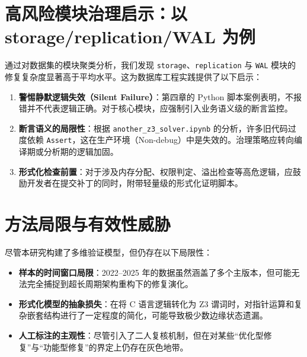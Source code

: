 \section{高风险模块治理启示：以 storage/replication/WAL 为例}

通过对数据集的模块聚类分析，我们发现 \texttt{storage}、\texttt{replication} 与 \texttt{WAL} 模块的修复复杂度显著高于平均水平。这为数据库工程实践提供了以下启示：

\begin{enumerate}
    \item \textbf{警惕静默逻辑失效（Silent Failure）}：第四章的 Python 脚本案例表明，不报错并不代表逻辑正确。对于核心模块，应强制引入业务语义级的断言监控。
    \item \textbf{断言语义的局限性}：根据 \texttt{another\_z3\_solver.ipynb} 的分析，许多旧代码过度依赖 \texttt{Assert}，这在生产环境（Non-debug）中是失效的。治理策略应转向编译期或分析期的逻辑加固。
    \item \textbf{形式化检查前置}：对于涉及内存分配、权限判定、溢出检查等高危逻辑，应鼓励开发者在提交补丁的同时，附带轻量级的形式化证明脚本。
\end{enumerate}

\section{方法局限与有效性威胁}

尽管本研究构建了多维验证模型，但仍存在以下局限性：
\begin{itemize}
    \item \textbf{样本的时间窗口局限}：2022--2025 年的数据虽然涵盖了多个主版本，但可能无法完全捕捉到超长周期架构重构下的修复演化。
    \item \textbf{形式化模型的抽象损失}：在将 C 语言逻辑转化为 Z3 谓词时，对指针运算和复杂嵌套结构进行了一定程度的简化，可能导致极少数边缘状态遗漏。
    \item \textbf{人工标注的主观性}：尽管引入了二人复核机制，但在对某些“优化型修复”与“功能型修复”的界定上仍存在灰色地带。
\end{itemize}
